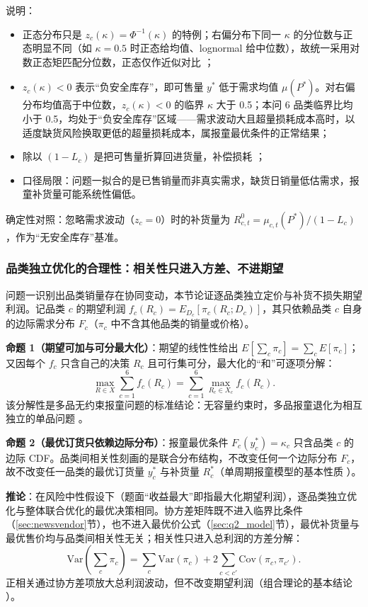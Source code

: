 说明：
\begin{itemize}
\item 正态分布只是 $z_c(\kappa)=\Phi^{-1}(\kappa)$ 的特例；右偏分布下同一 $\kappa$ 的分位数与正态明显不同（如 $\kappa=0.5$ 时正态给均值、lognormal 给中位数），故统一采用对数正态矩匹配分位数，正态仅作近似对比 \cite{agrawal1996}；
\item $z_c(\kappa)<0$ 表示“负安全库存”，即可售量 $y^*$ 低于需求均值 $\mu(P^*)$。对右偏分布均值高于中位数，$z_c(\kappa)<0$ 的临界 $\kappa$ 大于 0.5；本问 6 品类临界比均小于 0.5，均处于“负安全库存”区域——需求波动大且超量损耗成本高时，以适度缺货风险换取更低的超量损耗成本，属报童最优条件的正常结果；
\item 除以 $(1-L_c)$ 是把可售量折算回进货量，补偿损耗 \cite{nahmias1982}；
\item 口径局限：问题一拟合的是已售销量而非真实需求，缺货日销量低估需求，报童补货量可能系统性偏低。
\end{itemize}

确定性对照：忽略需求波动（$z_c=0$）时的补货量为 $R^0_{c,t}=\mu_{c,t}(P^*)/(1-L_c)$，作为“无安全库存”基准。

\subsubsection{品类独立优化的合理性：相关性只进入方差、不进期望}

问题一识别出品类销量存在协同变动，本节论证逐品类独立定价与补货不损失期望利润。记品类 $c$ 的期望利润 $f_c(R_c)=E_{D_c}\left[\pi_c(R_c;D_c)\right]$，其只依赖品类 $c$ 自身的边际需求分布 $F_c$（$\pi_c$ 中不含其他品类的销量或价格）。

\textbf{命题 1（期望可加与可分最大化）}：期望的线性性给出 $E[\sum_c\pi_c]=\sum_c E[\pi_c]$；又因每个 $f_c$ 只含自己的决策 $R_c$ 且可行集可分，最大化的“和”可逐项分解：
\begin{equation}
\max_{R\in X}\sum_{c=1}^{6}f_c(R_c)=\sum_{c=1}^{6}\max_{R_c\in X_c}f_c(R_c).
\end{equation}
该分解性是多品无约束报童问题的标准结论：无容量约束时，多品报童退化为相互独立的单品问题 \cite{silver2016}。

\textbf{命题 2（最优订货只依赖边际分布）}：报童最优条件 $F_c(y^*_c)=\kappa_c$ 只含品类 $c$ 的边际 CDF。品类间相关性刻画的是联合分布结构，不改变任何一个边际分布 $F_c$，故不改变任一品类的最优订货量 $y^*_c$ 与补货量 $R^*_c$（单周期报童模型的基本性质 \cite{khouja1999,petruzzi1999}）。

\textbf{推论}：在风险中性假设下（题面“收益最大”即指最大化期望利润），逐品类独立优化与整体联合优化的最优决策相同。协方差矩阵既不进入临界比条件（\ref{sec:newsvendor}节），也不进入最优价公式（\ref{sec:q2_model}节），最优补货量与最优售价均与品类间相关性无关；相关性只进入总利润的方差分解：
\begin{equation}
\mathrm{Var}\left(\sum_c\pi_c\right)=\sum_c\mathrm{Var}(\pi_c)+2\sum_{c<c'}\mathrm{Cov}(\pi_c,\pi_{c'}).
\end{equation}
正相关通过协方差项放大总利润波动，但不改变期望利润（组合理论的基本结论 \cite{markowitz1952}）。

